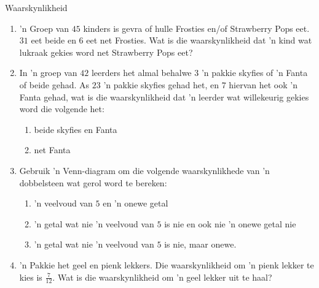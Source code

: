 \begin{eocexercises}{Waarskynlikheid}
  \begin{enumerate}[itemsep=5pt, label=\textbf{\arabic*}.]
  \item 'n Groep van $45$ kinders is gevra of hulle  Frosties en/of
    Strawberry Pops eet. $31$ eet beide en $6$ eet net Frosties.  Wat is die waarskynlikheid dat 'n kind wat lukraak gekies word net Strawberry
    Pops eet?
  \item In 'n groep van $42$ leerders het almal behalwe $3$ 'n pakkie skyfies of 'n Fanta of beide gehad. As $23$ 'n pakkie skyfies gehad het, en $7$ hiervan het ook 'n Fanta gehad, wat is die waarskynlikheid dat 'n leerder wat willekeurig gekies word die volgende het:
    \begin{enumerate}[noitemsep, label=\textbf{(\alph*)} ]
    \item beide skyfies en Fanta
    \item net Fanta
    \end{enumerate}
  \item Gebruik 'n Venn-diagram om die volgende waarskynlikhede van 'n dobbelsteen wat gerol word te bereken:
    \begin{enumerate}[noitemsep, label=\textbf{(\alph*)} ]
    \item 'n veelvoud van $5$ en 'n onewe getal
    \item 'n getal wat nie 'n veelvoud van $5$ is nie en ook nie 'n onewe getal nie
    \item 'n getal wat nie 'n veelvoud van $5$ is nie, maar onewe.
    \end{enumerate}
  \item 'n Pakkie het geel en pienk lekkers. Die waarskynlikheid om 'n pienk lekker te kies is $\frac{7}{12}$.
Wat is die waarskynlikheid om 'n geel lekker uit te haal?


\end{enumerate}
\end{eocexercises}
